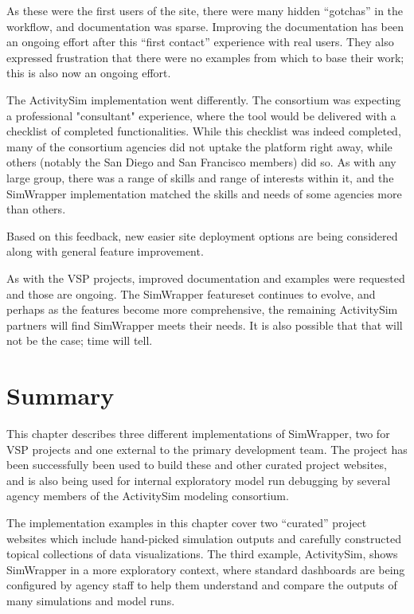 As these were the first users of the site, there were many hidden ``gotchas'' in the workflow, and documentation was sparse. Improving the documentation has been an ongoing effort after this ``first contact'' experience with real users. They also expressed frustration that there were no examples from which to base their work; this is also now an ongoing effort.

The ActivitySim implementation went differently. The consortium was expecting a professional "consultant" experience, where the tool would be delivered with a checklist of completed functionalities. While this checklist was indeed completed, many of the consortium agencies did not uptake the platform right away, while others (notably the San Diego and San Francisco members) did so. As with any large group, there was a range of skills and range of interests within it, and the SimWrapper implementation matched the skills and needs of some agencies more than others.

Based on this feedback, new easier site deployment options are being considered along with general feature improvement.

As with the VSP projects, improved documentation and examples were requested and those are ongoing. The SimWrapper featureset continues to evolve, and perhaps as the features become more comprehensive, the remaining ActivitySim partners will find SimWrapper meets their needs. It is also possible that that will not be the case; time will tell.


\section{Summary}
\label{sites-summary}

This chapter describes three different implementations of SimWrapper, two for VSP projects and one external to the primary development team. The project has been successfully been used to build these and other curated project websites, and is also being used for internal exploratory model run debugging by several agency members of the ActivitySim modeling consortium.

The implementation examples in this chapter cover two ``curated'' project websites which include hand-picked simulation outputs and carefully constructed topical collections of data visualizations. The third example, ActivitySim, shows SimWrapper in a more exploratory context, where standard dashboards are being configured by agency staff to help them understand and compare the outputs of many simulations and model runs.

